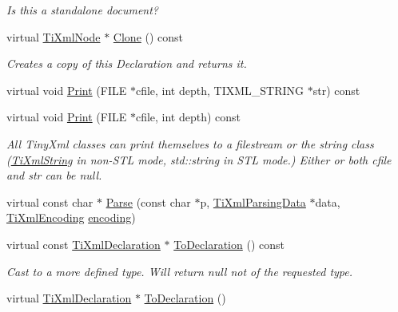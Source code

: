 \begin{DoxyCompactItemize}
\begin{DoxyCompactList}\small\item\em Is this a standalone document? \item\end{DoxyCompactList}\item 
virtual \hyperlink{classTiXmlNode}{TiXmlNode} $\ast$ \hyperlink{classTiXmlDeclaration_aff8231266d735943d8a7514a9c9822b9}{Clone} () const 
\begin{DoxyCompactList}\small\item\em Creates a copy of this Declaration and returns it. \item\end{DoxyCompactList}\item 
virtual void \hyperlink{classTiXmlDeclaration_aa5ab32ec19d4eeecff4a9238c6c90565}{Print} (FILE $\ast$cfile, int depth, TIXML\_\-STRING $\ast$str) const 
\item 
virtual void \hyperlink{classTiXmlDeclaration_abf6303db4bd05b5be554036817ff1cb4}{Print} (FILE $\ast$cfile, int depth) const 
\begin{DoxyCompactList}\small\item\em All TinyXml classes can print themselves to a filestream or the string class (\hyperlink{classTiXmlString}{TiXmlString} in non-\/STL mode, std::string in STL mode.) Either or both cfile and str can be null. \item\end{DoxyCompactList}\item 
virtual const char $\ast$ \hyperlink{classTiXmlDeclaration_a9839ea97ed687a2b7342fd7b0f04361b}{Parse} (const char $\ast$p, \hyperlink{classTiXmlParsingData}{TiXmlParsingData} $\ast$data, \hyperlink{tinyxml_8h_a88d51847a13ee0f4b4d320d03d2c4d96}{TiXmlEncoding} \hyperlink{classTiXmlDeclaration_a24b8645d7696ec169bbb3fb7d30860cf}{encoding})
\item 
virtual const \hyperlink{classTiXmlDeclaration}{TiXmlDeclaration} $\ast$ \hyperlink{classTiXmlDeclaration_a1e085d3fefd1dbf5ccdbff729931a967}{ToDeclaration} () const 
\begin{DoxyCompactList}\small\item\em Cast to a more defined type. Will return null not of the requested type. \item\end{DoxyCompactList}\item 
virtual \hyperlink{classTiXmlDeclaration}{TiXmlDeclaration} $\ast$ \hyperlink{classTiXmlDeclaration_a6bd3d1daddcaeb9543c24bfd090969ce}{ToDeclaration} ()

\end{DoxyCompactItemize}
